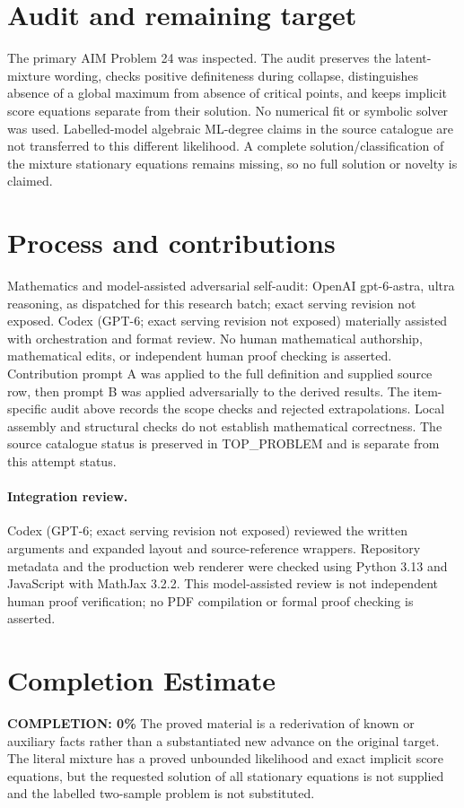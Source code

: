 \documentclass[11pt]{article}
\begin{document}
\section{Audit and remaining target}
The primary AIM Problem 24 was inspected. The audit preserves the
latent-mixture wording, checks positive definiteness during collapse,
distinguishes absence of a global maximum from absence of critical
points, and keeps implicit score equations separate from their solution.
No numerical fit or symbolic solver was used. Labelled-model algebraic
ML-degree claims in the source catalogue are not transferred to this
different likelihood. A complete solution/classification of the mixture
stationary equations remains missing, so no full solution or novelty
is claimed.

\section{Process and contributions}
Mathematics and model-assisted adversarial self-audit: OpenAI gpt-6-astra, ultra reasoning, as dispatched for this research batch; exact serving revision not exposed. Codex (GPT-6; exact serving revision not exposed) materially assisted with orchestration and format review. No human mathematical authorship, mathematical edits, or independent human proof checking is asserted.
Contribution prompt A was applied to the full definition and supplied source row, then prompt B was applied adversarially to the derived results. The item-specific audit above records the scope checks and rejected extrapolations. Local assembly and structural checks do not establish mathematical correctness. The source catalogue status is preserved in TOP\_PROBLEM and is separate from this attempt status.
\paragraph{Integration review.} Codex (GPT-6; exact serving revision not exposed) reviewed the written arguments and expanded layout and source-reference wrappers. Repository metadata and the production web renderer were checked using Python 3.13 and JavaScript with MathJax 3.2.2. This model-assisted review is not independent human proof verification; no PDF compilation or formal proof checking is asserted.

\section{Completion Estimate}
\noindent\textbf{COMPLETION: 0\%}
The proved material is a rederivation of known or auxiliary facts rather than a substantiated new advance on the original target. The literal mixture has a proved unbounded likelihood and exact implicit score equations, but the requested solution of all stationary equations is not supplied and the labelled two-sample problem is not substituted.
\end{document}
